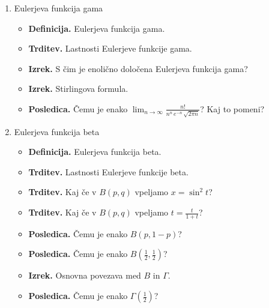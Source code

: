 \begin{enumerate}
\begin{itemize}
    \end{itemize}
    \item Eulerjeva funkcija gama
    \begin{itemize}
        \item \textbf{Definicija.} Eulerjeva funkcija gama.
        \item \textbf{Trditev.} Lastnosti Eulerjeve funkcije gama.
        \item \textbf{Izrek.} S čim je enolično določena Eulerjeva funkcija gama?
        \item \textbf{Izrek.} Stirlingova formula.
        \item \textbf{Posledica.} Čemu je enako \(\lim_{n \to \infty} \frac{n!}{n^n \, e^{-n} \, \sqrt{2 \pi n}}\)? Kaj to pomeni?
    \end{itemize}

    \item Eulerjeva funkcija beta
    \begin{itemize}
        \item \textbf{Definicija.} Eulerjeva funkcija beta.
        \item \textbf{Trditev.} Lastnosti Eulerjeve funkcije beta.
        \item \textbf{Trditev.} Kaj če v \(B(p,q)\) vpeljamo \(x = \sin^2 t\)?
        \item \textbf{Trditev.} Kaj če v \(B(p,q)\) vpeljamo \(t = \frac{t}{1+t}\)?
        \item \textbf{Posledica.} Čemu je enako \(B(p, 1-p)\)?
        \item \textbf{Posledica.} Čemu je enako \(B(\frac{1}{2}, \frac{1}{2})\)?
        \item \textbf{Izrek.} Osnovna povezava med \(B\) in \(\Gamma\).
        \item \textbf{Posledica.} Čemu je enako \(\Gamma(\frac{1}{2})\)?
    \end{itemize}
\end{enumerate}

